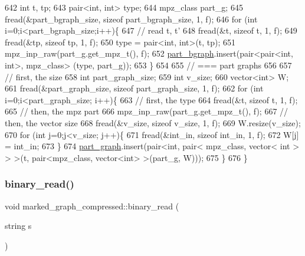 \begin{DoxyCode}
642   \textcolor{keywordtype}{int} t, tp;
643   pair<int, int> type; 
644   mpz\_class part\_g; 
645   fread(&part\_bgraph\_size, \textcolor{keyword}{sizeof} part\_bgraph\_size, 1, f);
646   \textcolor{keywordflow}{for} (\textcolor{keywordtype}{int} i=0;i<part\_bgraph\_size;i++)\{
647     \textcolor{comment}{// read t, t'}
648     fread(&t, \textcolor{keyword}{sizeof} t, 1, f);
649     fread(&tp, \textcolor{keyword}{sizeof} tp, 1, f);
650     type = pair<int, int>(t, tp);
651     mpz\_inp\_raw(part\_g.get\_mpz\_t(), f);
652     \hyperlink{classmarked__graph__compressed_a7b3267063fba30b45eb21b3ba4e07536}{part\_bgraph}.insert(pair<pair<int, int>, mpz\_class> (type, part\_g));
653   \}
654 
655   \textcolor{comment}{// === part graphs}
656 
657   \textcolor{comment}{// first, the size}
658   \textcolor{keywordtype}{int} part\_graph\_size;
659   \textcolor{keywordtype}{int} v\_size;
660   vector<int> W; 
661   fread(&part\_graph\_size, \textcolor{keyword}{sizeof} part\_graph\_size, 1, f);
662   \textcolor{keywordflow}{for} (\textcolor{keywordtype}{int} i=0;i<part\_graph\_size; i++)\{
663     \textcolor{comment}{// first, the type}
664     fread(&t, \textcolor{keyword}{sizeof} t, 1, f);
665     \textcolor{comment}{// then, the mpz part}
666     mpz\_inp\_raw(part\_g.get\_mpz\_t(), f);
667     \textcolor{comment}{// then, the vector size}
668     fread(&v\_size, \textcolor{keyword}{sizeof} v\_size, 1, f);
669     W.resize(v\_size);
670     \textcolor{keywordflow}{for} (\textcolor{keywordtype}{int} j=0;j<v\_size; j++)\{
671       fread(&int\_in, \textcolor{keyword}{sizeof} int\_in, 1, f);
672       W[j] = int\_in;
673     \}
674     \hyperlink{classmarked__graph__compressed_ae179a4737e6eab905c18a94d44ef64b7}{part\_graph}.insert(pair<\textcolor{keywordtype}{int}, pair< mpz\_class, vector< int > > >(t, pair<mpz\_class, vector<int>
       >(part\_g, W)));
675   \}
676 \}
\end{DoxyCode}
\mbox{\label{classmarked__graph__compressed_a01c67fe4234738db6bb60459515c3ad8}} 
\subsubsection{\texorpdfstring{binary\+\_\+read()}{binary\_read()}\hspace{0.1cm}{\footnotesize\ttfamily [2/2]}}
{\footnotesize\ttfamily void marked\+\_\+graph\+\_\+compressed\+::binary\+\_\+read (\begin{DoxyParamCaption}\item[{string}]{s }\end{DoxyParamCaption})}

